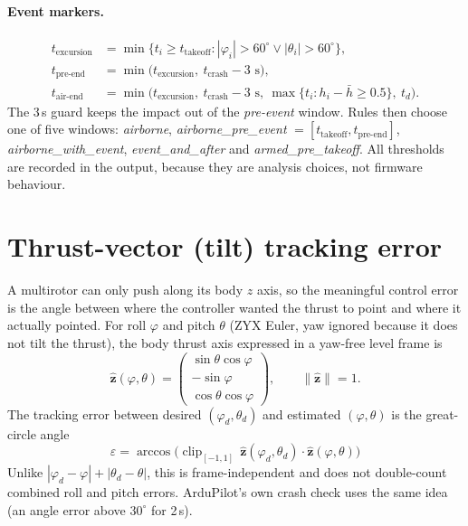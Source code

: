 \documentclass[11pt,a4paper]{article}
\begin{document}
\paragraph{Event markers.}
\begin{align*}
t_{\text{excursion}} &= \min\{t_i\ge t_{\text{takeoff}} : |\varphi_i|>60^\circ \vee |\theta_i|>60^\circ\},\\
t_{\text{pre-end}} &= \min\bigl(t_{\text{excursion}},\ t_{\text{crash}}-3\text{ s}\bigr),\\
t_{\text{air-end}} &= \min\bigl(t_{\text{excursion}},\ t_{\text{crash}}-3\text{ s},\ 
   \max\{t_i : h_i-\bar h\ge 0.5\},\ t_d\bigr).
\end{align*}
The 3\,s guard keeps the impact out of the \emph{pre-event} window. Rules then choose one of five
windows: \emph{airborne}, \emph{airborne\_pre\_event}
$=[t_{\text{takeoff}},t_{\text{pre-end}}]$, \emph{airborne\_with\_event}, \emph{event\_and\_after}
and \emph{armed\_pre\_takeoff}. All thresholds are recorded in the output, because they are
analysis choices, not firmware behaviour.

\section{Thrust-vector (tilt) tracking error}

A multirotor can only push along its body $z$ axis, so the meaningful control error is the angle
between where the controller wanted the thrust to point and where it actually pointed. For roll
$\varphi$ and pitch $\theta$ (ZYX Euler, yaw ignored because it does not tilt the thrust), the body
thrust axis expressed in a yaw-free level frame is
\[
\hat{\mathbf z}(\varphi,\theta)=
\begin{pmatrix}\sin\theta\cos\varphi\\ -\sin\varphi\\ \cos\theta\cos\varphi\end{pmatrix},
\qquad \|\hat{\mathbf z}\|=1.
\]
The tracking error between desired $(\varphi_d,\theta_d)$ and estimated $(\varphi,\theta)$ is the
great-circle angle
\[
\boxed{\;\varepsilon = \arccos\bigl(\operatorname{clip}_{[-1,1]}\,
\hat{\mathbf z}(\varphi_d,\theta_d)\cdot\hat{\mathbf z}(\varphi,\theta)\bigr)\;}
\]
Unlike $|\varphi_d-\varphi|+|\theta_d-\theta|$, this is frame-independent and does not
double-count combined roll and pitch errors. ArduPilot's own crash check uses the same idea (an
angle error above $30^\circ$ for 2\,s).
\end{document}
